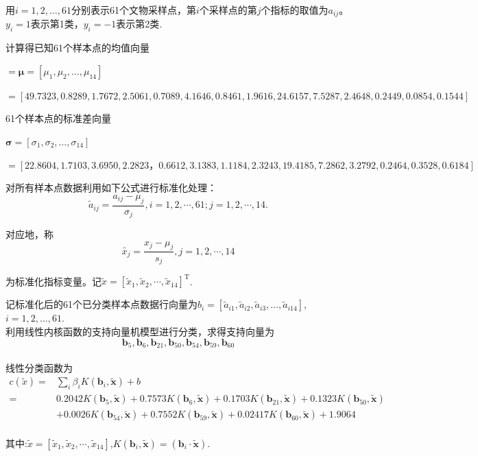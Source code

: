 \documentclass{my_paper}
\begin{document}
用$i=1,2,\dots,61 $分别表示61个文物采样点，第$i$个采样点的第$j$个指标的取值为$a_{ij}$。$y_i=1$表示第1类，$y_i=-1$表示第2类.

计算得已知61个样本点的均值向量

$=\boldsymbol{\mu}=[\mu_1,\mu_2,\dots,\mu_{14}]$

$=[49.7323,0.8289,1.7672,2.5061,0.7089,4.1646,0.8461,1.9616,24.6157,7.5287,2.4648,0.2449,0.0854,0.1544]$

61个样本点的标准差向量

$\boldsymbol{\sigma}=[\sigma_1,\sigma_2,\dots,\sigma_{14}]$

$=[22.8604,1.7103,3.6950,2.2823，0.6612,3.1383,1.1184,2.3243,19.4185,7.2862,3.2792,0.2464,0.3528,0.6184]$

对所有样本点数据利用如下公式进行标准化处理：
$$ \tilde{a}_{i j}=\frac{a_{i j}-\mu_{j}}{\sigma_{j}}, i=1,2, \cdots, 61 ; j=1,2, \cdots, 14.$$

对应地，称
$$\tilde{x_{j}}=\frac{x_{j}-\mu_{j}}{s_{j}}, j=1,2, \cdots, 14 $$

为标准化指标变量。记$\tilde{x}=\left[\tilde{x}_{1}, \tilde{x}_{2}, \cdots, \tilde{x}_{14}\right]^{\mathrm{T}}$.

记标准化后的61个已分类样本点数据行向量为$b_i=[\tilde{a}_{i 1},\tilde{a}_{i 2},\tilde{a}_{i 3},\dots,\tilde{a}_{i 14}]$,$i=1,2,\dots,61$.\\
利用线性内核函数的支持向量机模型进行分类，求得支持向量为$${\textbf{b}_5,\textbf{b}_6,\textbf{b}_{21},\textbf{b}_{50},\textbf{b}_{54},\textbf{b}_{59},\textbf{b}_{60}}$$ \\
线性分类函数为\\
$$
\begin{aligned}
c(\tilde{x})=& \sum_{i} \beta_{i} K\left(\boldsymbol{b}_{i}, \tilde{\boldsymbol{x}}\right)+b \\
=& 0.2042 K\left(\boldsymbol{b}_{5}, \tilde{\boldsymbol{x}}\right)+0.7573 K\left(\boldsymbol{b}_{6}, \tilde{\boldsymbol{x}}\right)+0.1703 K\left(\boldsymbol{b}_{21}, \tilde{\boldsymbol{x}}\right)+0.1323 K\left(\boldsymbol{b}_{50}, \tilde{\boldsymbol{x}}\right) \\
&+0.0026 K\left(\boldsymbol{b}_{54}, \tilde{\boldsymbol{x}}\right)+0.7552 K\left(\boldsymbol{b}_{59}, \tilde{\boldsymbol{x}}\right)+0.02417 K\left(\boldsymbol{b}_{60}, \tilde{\boldsymbol{x}}\right)+1.9064
\end{aligned}$$\\
其中:$\tilde{x}=\left[\tilde{x}_{1}, \tilde{x}_{2}, \cdots, \tilde{x}_{14}\right]$,$K\left(\boldsymbol{b}_i, \tilde{\boldsymbol{x}}\right)=\left(\boldsymbol{b}_{i}\cdot\tilde{\boldsymbol{x}}\right)$.
\end{document}
